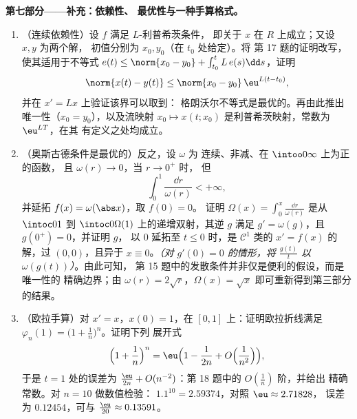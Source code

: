 \begin{problem}[{周末问题——无利普希茨条件时
$x' = f(t, x)$ 解的存在性}]
\medskip
\noindent\textbf{第七部分——补充：依赖性、
最优性与一种手算格式。}
\begin{enumerate}[resume]
  \item （连续依赖性）设 $f$ 满足 $L$-利普希茨条件，
        即关于 $x$ 在 $R$ 上成立；又设 $x, y$ 为两个解，
        初值分别为 $x_0, y_0$（在 $t_0$ 处给定）。将
        第 17 题的证明改写，使其适用于不等式 $e(t) \leq \norm{x_0
        - y_0} + \int_{t_0}^tL\,e(s)\dd s$，证明
        \[
        \norm{x(t) - y(t)} \leq \norm{x_0 - y_0}\,
        \eu^{L(t - t_0)},
        \]
        并在 $x' = Lx$ 上验证该界可以取到：
        格朗沃尔不等式是最优的。再由此推出唯一性（$x_0 =
        y_0$），以及流映射 $x_0 \mapsto x(t; x_0)$
        是利普希茨映射，常数为 $\eu^{LT}$，在其
        有定义之处均成立。
  \item （奥斯古德条件是最优的）反之，设 $\omega$ 为
        连续、非减、在 $\intoo0\infty$ 上为正的函数，
        且 $\omega(r) \to 0$，当 $r \to 0^+$ 时，
        但
        \[
        \int_0^1\frac{\dd r}{\omega(r)} < +\infty,
        \]
        并延拓 $f(x) = \omega(\abs x)$，取 $f(0) = 0$。
        证明 $\Omega(x) = \int_0^x\frac{\dd r}{\omega(r)}$
        是从 $\intoc0{1}$ 到
        $\intoc0{\Omega(1)}$ 上的递增双射，其逆 $g$ 满足 $g'
        = \omega(g)$，且 $g(0^+) = 0$，并证明 $g$，
        以 $0$ 延拓至 $t \leq 0$ 时，是
        $\mathcal C^1$ 类的 $x' = f(x)$ 的解，过 $(0, 0)$，且异于 $x \equiv
        0$。\emph{（对 $g'(0) = 0$ 的情形，将 $\frac{g(t)}t$ 以
        $\omega(g(t))$）}。由此可知，
        第 15 题中的发散条件并非仅是便利的假设，而是唯一性的
        精确边界；由
        $\omega(r) = 2\sqrt r$，$\Omega(x) = \sqrt x$ 即可重新得到第三部分的结果。
  \item （欧拉手算）对 $x' = x$，$x(0) = 1$，在
        $[0, 1]$ 上：证明欧拉折线满足
        $\varphi_n(1) = \bigl(1 + \frac1n\bigr)^n$。证明下列
        展开式
        \[
        \Bigl(1 + \frac1n\Bigr)^{n}
        = \eu\Bigl(1 - \frac1{2n} + O\Bigl(\frac1{n^2}\Bigr)
        \Bigr),
        \]
        于是 $t = 1$ 处的误差为 $\frac{\eu}{2n} +
        O(n^{-2})$：第 18 题中的 $O(\frac1n)$ 阶，并给出
        精确常数。对 $n = 10$ 做数值检验：
        $1.1^{10} = 2.59374$，对照 $\eu \approx 2.71828$，
        误差为 $0.12454$，可与 $\frac{\eu}{20}
        \approx 0.13591$。
\end{enumerate}
\end{problem}
